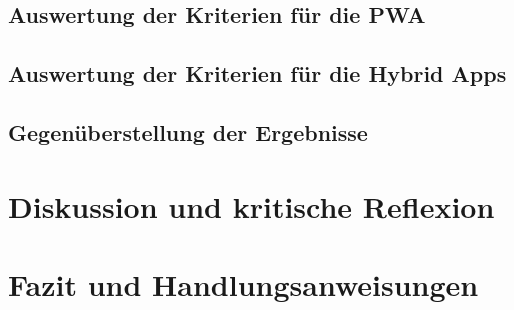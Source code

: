 	\section{Auswertung der Kriterien für die PWA}
			
	\section{Auswertung der Kriterien für die Hybrid Apps}
		
	\section{Gegenüberstellung der Ergebnisse}

\chapter{Diskussion und kritische Reflexion}

\chapter{Fazit und Handlungsanweisungen}


